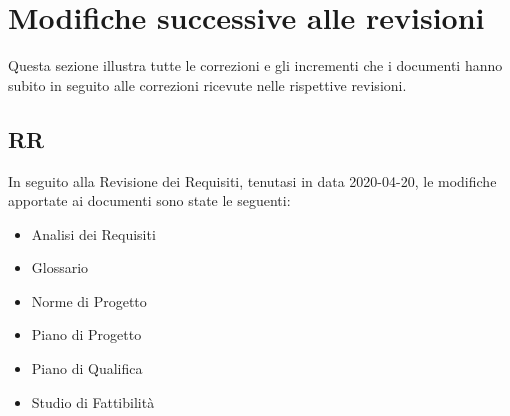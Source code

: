 \section{Modifiche successive alle revisioni}
Questa sezione illustra tutte le correzioni e gli incrementi che i documenti hanno subito in seguito alle correzioni ricevute nelle rispettive revisioni.

\subsection{RR}
In seguito alla Revisione dei Requisiti, tenutasi in data 2020-04-20, le modifiche apportate ai documenti sono state le seguenti:
\begin{itemize}
	\item{Analisi dei Requisiti}
	\item{Glossario}
	\item{Norme di Progetto}
	\item{Piano di Progetto}
	\item{Piano di Qualifica}
	\item{Studio di Fattibilità}
\end{itemize}